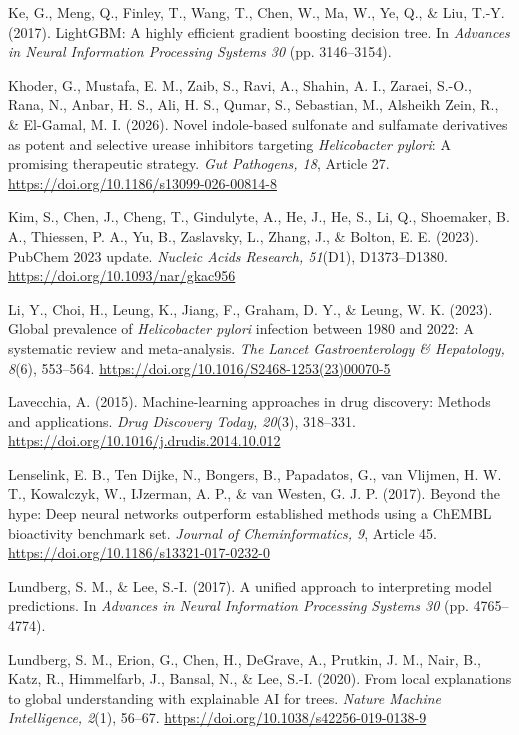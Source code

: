 \documentclass[11pt]{article}
\begin{document}
Ke, G., Meng, Q., Finley, T., Wang, T., Chen, W., Ma, W., Ye, Q., \& Liu, T.-Y. (2017). LightGBM: A highly efficient gradient boosting decision tree. In \textit{Advances in Neural Information Processing Systems 30} (pp. 3146--3154).

Khoder, G., Mustafa, E. M., Zaib, S., Ravi, A., Shahin, A. I., Zaraei, S.-O., Rana, N., Anbar, H. S., Ali, H. S., Qumar, S., Sebastian, M., Alsheikh Zein, R., \& El-Gamal, M. I. (2026). Novel indole-based sulfonate and sulfamate derivatives as potent and selective urease inhibitors targeting \textit{Helicobacter pylori}: A promising therapeutic strategy. \textit{Gut Pathogens, 18}, Article 27. \url{https://doi.org/10.1186/s13099-026-00814-8}

Kim, S., Chen, J., Cheng, T., Gindulyte, A., He, J., He, S., Li, Q., Shoemaker, B. A., Thiessen, P. A., Yu, B., Zaslavsky, L., Zhang, J., \& Bolton, E. E. (2023). PubChem 2023 update. \textit{Nucleic Acids Research, 51}(D1), D1373--D1380. \url{https://doi.org/10.1093/nar/gkac956}

Li, Y., Choi, H., Leung, K., Jiang, F., Graham, D. Y., \& Leung, W. K. (2023). Global prevalence of \textit{Helicobacter pylori} infection between 1980 and 2022: A systematic review and meta-analysis. \textit{The Lancet Gastroenterology \& Hepatology, 8}(6), 553--564. \url{https://doi.org/10.1016/S2468-1253(23)00070-5}

Lavecchia, A. (2015). Machine-learning approaches in drug discovery: Methods and applications. \textit{Drug Discovery Today, 20}(3), 318--331. \url{https://doi.org/10.1016/j.drudis.2014.10.012}

Lenselink, E. B., Ten Dijke, N., Bongers, B., Papadatos, G., van Vlijmen, H. W. T., Kowalczyk, W., IJzerman, A. P., \& van Westen, G. J. P. (2017). Beyond the hype: Deep neural networks outperform established methods using a ChEMBL bioactivity benchmark set. \textit{Journal of Cheminformatics, 9}, Article 45. \url{https://doi.org/10.1186/s13321-017-0232-0}

Lundberg, S. M., \& Lee, S.-I. (2017). A unified approach to interpreting model predictions. In \textit{Advances in Neural Information Processing Systems 30} (pp. 4765--4774).

Lundberg, S. M., Erion, G., Chen, H., DeGrave, A., Prutkin, J. M., Nair, B., Katz, R., Himmelfarb, J., Bansal, N., \& Lee, S.-I. (2020). From local explanations to global understanding with explainable AI for trees. \textit{Nature Machine Intelligence, 2}(1), 56--67. \url{https://doi.org/10.1038/s42256-019-0138-9}
\end{document}
